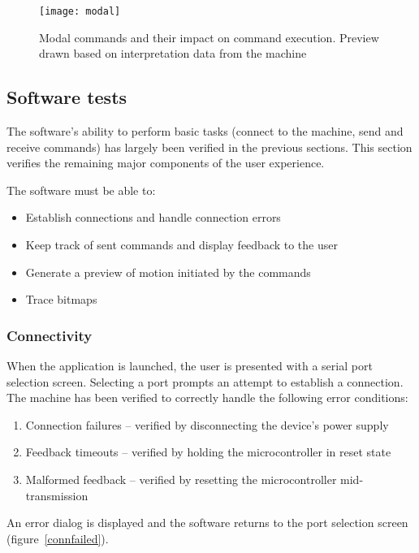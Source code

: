 \begin{figure}[ht]
    \begin{center}
        \texttt{[image: modal]}
        \caption{Modal commands and their impact on command execution. Preview
        drawn based on interpretation data from the machine}
        \label{modals}
    \end{center}
\end{figure}

\clearpage
\subsection{Software tests}

The software's ability to perform basic tasks (connect to the machine,
send and receive commands) has largely been verified in the previous sections.
This section verifies the remaining major components of the user experience.

The software must be able to:
\begin{itemize}
    \item Establish connections and handle connection errors
    \item Keep track of sent commands and display feedback to the user
    \item Generate a preview of motion initiated by the commands
    \item Trace bitmaps
\end{itemize}

\subsubsection{Connectivity}

When the application is launched, the user is presented with a serial port
selection screen. Selecting a port prompts an attempt to establish a connection.
The machine has been verified to correctly handle the following error
conditions:
\begin{enumerate}
    \item Connection failures -- verified by disconnecting the device's power
    supply
    \item Feedback timeouts -- verified by holding the microcontroller in reset
    state
    \item Malformed feedback -- verified by resetting the microcontroller
    mid-transmission
\end{enumerate}
An error dialog is displayed and the software returns to the port selection
screen (figure~\ref{connfailed}).

